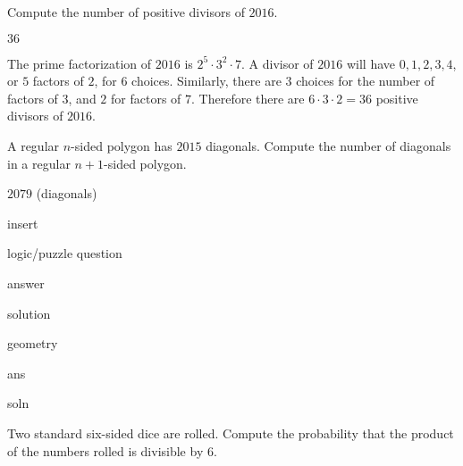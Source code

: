 \documentclass[11pt]{article}
\begin{document}
\begin{problem}
Compute the number of positive divisors of $2016$.
\end{problem}

\begin{answer}
$\boxed{36}$
\end{answer}

\begin{solution}
The prime factorization of $2016$ is $2^5 \cdot 3^2 \cdot 7$. A divisor of $2016$ will have $0, 1, 2, 3, 4$, or $5$ factors of $2$, for $6$ choices. Similarly, there are $3$ choices for the number of factors of $3$, and $2$ for factors of $7$. Therefore there are $6 \cdot 3 \cdot 2 = \boxed{36}$ positive divisors of $2016$.
\end{solution}


\begin{problem}
A regular $n$-sided polygon has $2015$ diagonals. Compute the number of diagonals in a regular $n+1$-sided polygon.
\end{problem}

\begin{answer}
$\boxed{2079}$ (diagonals)
\end{answer}

\begin{solution}
insert
\end{solution}


\begin{problem}
logic/puzzle question
\end{problem}

\begin{answer}
answer
\end{answer}

\begin{solution}
solution
\end{solution}


\begin{problem}
geometry
\end{problem}

\begin{answer}
ans
\end{answer}

\begin{solution}
soln
\end{solution}


\begin{problem}
Two standard six-sided dice are rolled. Compute the probability that the product of the numbers rolled is divisible by $6$.
\end{problem}
\end{document}
